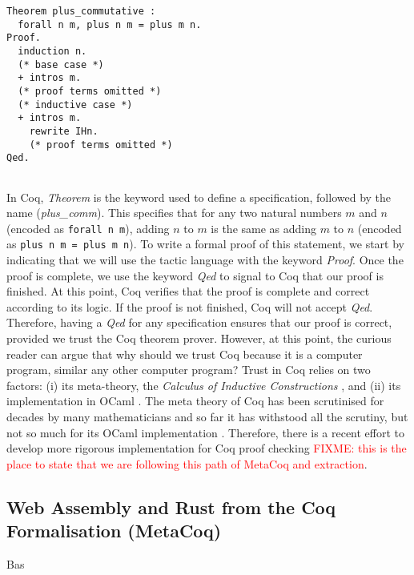 \documentclass[conference,compsoc]{IEEEtran}
\begin{document}
\begin{lstlisting}[frame=single, language=Coq, caption={Addition is Commutative},
  label={plus_comm},captionpos=t, basicstyle=\ttfamily\footnotesize,
  abovecaptionskip=-\medskipamount]
Theorem plus_commutative : 
  forall n m, plus n m = plus m n. 
Proof.
  induction n.
  (* base case *)
  + intros m.
  (* proof terms omitted *)
  (* inductive case *)  
  + intros m.
    rewrite IHn.
    (* proof terms omitted *)
Qed.
  
\end{lstlisting}

In Coq, \emph{Theorem} is the keyword used to define a specification, 
followed by the name (\emph{plus\_comm}). This specifies that for any 
two natural numbers $m$ and $n$ (encoded as \texttt{forall n m}), 
adding $n$ to $m$ is the same as adding $m$ to $n$ 
(encoded as \texttt{plus n m = plus m n}).
To write a formal proof of this statement, we start by indicating that 
we will use the tactic language with the keyword \emph{Proof}. Once the 
proof is complete, we use the keyword \emph{Qed} to signal to Coq that 
our proof is finished. At this point, Coq verifies that the proof is complete 
and correct according to its logic. If the proof is not finished, Coq will 
not accept \emph{Qed}. Therefore, having a \emph{Qed} for any specification 
ensures that our proof is correct, provided we trust the Coq theorem prover.
However, at this point, the curious reader can argue that why should we trust 
Coq because it is a computer program, similar any other computer program? 
Trust in Coq relies on two factors: (i) its meta-theory, the 
\emph{Calculus of Inductive Constructions} \cite{thierry1988calculus}, and 
(ii) its implementation in OCaml \cite{the_coq_development_team}.
The meta theory of Coq has been scrutinised for decades
by many mathematicians and so far it has withstood all 
the scrutiny, but not so much for its OCaml implementation \cite{coq_critical_bugs}. 
Therefore, there is a recent effort to develop more 
rigorous implementation for Coq proof checking \cite{10.1145/3371076} \textcolor{red}{FIXME: this is the place 
to state that we are following this path of MetaCoq and extraction}.


\subsection{Web Assembly and Rust from the Coq Formalisation (MetaCoq)}
  Bas
\end{document}
